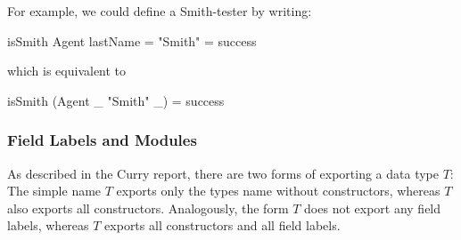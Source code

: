
\noindent
For example, we could define a Smith-tester by writing:
\begin{curry}
isSmith Agent { lastName = "Smith" } = success
\end{curry}
which is equivalent to
\begin{curry}
isSmith (Agent _ "Smith" _) = success
\end{curry}

\subsubsection{Field Labels and Modules}

As described in the Curry report, there are two forms of
exporting a data type $T$: The simple name $T$ exports only the types name
without constructors, whereas $T$ also exports all
constructors. Analogously, the form $T$ does not export any field labels,
whereas $T$ exports all constructors and all field labels.

